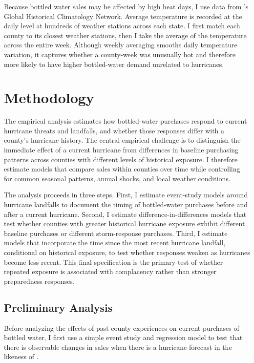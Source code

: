 \documentclass{article}
\begin{document}
Because bottled water sales may be affected by high heat days, I use data from \citeauthor{GHCN}'s Global Historical Climatology Network. Average temperature is recorded at the daily level at hundreds of weather stations across each state. I first match each county to its closest weather stations, then I take the average of the temperature across the entire week. Although weekly averaging smooths daily temperature variation, it captures whether a county-week was unusually hot and therefore more likely to have higher bottled-water demand unrelated to hurricanes. 

\section{Methodology}

The empirical analysis estimates how bottled-water purchases respond to current hurricane threats and landfalls, and whether those responses differ with a county's hurricane history. The central empirical challenge is to distinguish the immediate effect of a current hurricane from differences in baseline purchasing patterns across counties with different levels of historical exposure. I therefore estimate models that compare sales within counties over time while controlling for common seasonal patterns, annual shocks, and local weather conditions.

The analysis proceeds in three steps. First, I estimate event-study models around hurricane landfalls to document the timing of bottled-water purchases before and after a current hurricane. Second, I estimate difference-in-differences models that test whether counties with greater historical hurricane exposure exhibit different baseline purchases or different storm-response purchases. Third, I estimate models that incorporate the time since the most recent hurricane landfall, conditional on historical exposure, to test whether responses weaken as hurricanes become less recent. This final specification is the primary test of whether repeated exposure is associated with complacency rather than stronger preparedness responses.

\subsection{Preliminary Analysis}

Before analyzing the effects of past county experiences on current purchases of bottled water, I first use a simple event study and regression model to test that there is observable changes in sales when there is a hurricane forecast in the likeness of \cite{beatty2019disaster}. 
\end{document}
